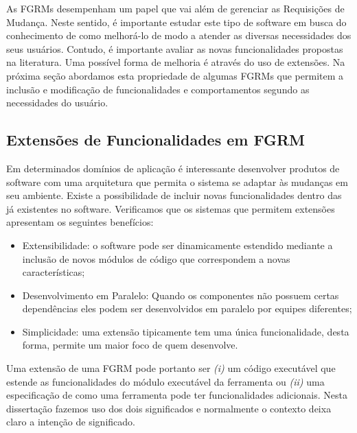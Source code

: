As FGRMs desempenham um papel que vai além de gerenciar as Requisições de
Mudança. Neste sentido, é importante estudar este tipo de software em busca do
conhecimento de como melhorá-lo de modo a atender as diversas necessidades dos
seus usuários. Contudo, é importante avaliar as novas funcionalidades propostas
na li\-te\-ra\-tu\-ra. Uma possível forma de melhoria é através do uso de
extensões. Na próxima seção abordamos esta propriedade de algumas FGRMs que
permitem a inclusão e modificação de funcionalidades e comportamentos segundo
as necessidades do usuário.

\subsection{Extensões de Funcionalidades em FGRM}\label{subsec:manutencao_visao_geral_extensoes_fgrm}

Em determinados domínios de aplicação é interessante desenvolver produtos de
software com uma arquitetura que permita o sistema se adaptar às mudanças em
seu ambiente. Existe a possibilidade de incluir novas funcionalidades dentro
das já existentes no software. Verificamos que os sistemas que permitem
extensões apresentam os seguintes benefícios:

\begin{itemize}

    \item Extensibilidade: o software pode ser dinamicamente estendido mediante
        a inclusão de novos módulos de código que correspondem a novas
        características;

    \item Desenvolvimento em Paralelo: Quando os componentes não possuem certas
        dependências eles podem ser desenvolvidos em paralelo por equipes
        diferentes;

    \item Simplicidade: uma extensão tipicamente tem uma única funcionalidade,
        desta forma, permite um maior foco de quem desenvolve.

\end{itemize}

Uma extensão de uma FGRM pode portanto ser \textit{(i)} um código executável
que estende as funcionalidades do módulo executável da ferramenta ou
\textit{(ii)} uma especificação de como uma ferramenta pode ter funcionalidades
adicionais. Nesta dissertação fazemos uso dos dois significados e normalmente o
contexto deixa claro a intenção de significado.

